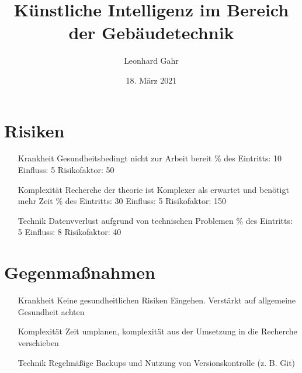 \documentclass[
	ngerman,
	12pt, %
]{pm}
\title{Künstliche Intelligenz im Bereich der Gebäudetechnik}
\author{Leonhard Gahr} %
\date{18. März 2021} %
\institute{\texttt{[image: ../img/sie-logo.png]}\hfill\texttt{[image: ../img/dhbw-logo]}} %
\begin{document}
\maketitle %


\section*{\large Risiken}
\begin{enumerate}
	\item [Krankheit] \quad Gesundheitsbedingt nicht zur Arbeit bereit \quad \% des Eintritts: 10 \quad Einfluss: 5 \quad Risikofaktor: 50
	\item [Komplexität] \quad Recherche der theorie ist Komplexer als erwartet und benötigt mehr Zeit \quad \% des Eintritts: 30 \quad Einfluss: 5 \quad Risikofaktor: 150
	\item [Technik] \quad Datenvverlust aufgrund von technischen Problemen \quad \% des Eintritts: 5 \quad Einfluss: 8 \quad Risikofaktor: 40
\end{enumerate}


\section*{\large Gegenmaßnahmen}
\begin{enumerate}
	\item [Krankheit] \quad Keine gesundheitlichen Risiken Eingehen. Verstärkt auf allgemeine Gesundheit achten
	\item [Komplexität] \quad Zeit umplanen, komplexität aus der Umsetzung in die Recherche verschieben
	\item [Technik] \quad Regelmäßige Backups und Nutzung von Versionskontrolle (z. B. Git)
\end{enumerate}
\end{document}
